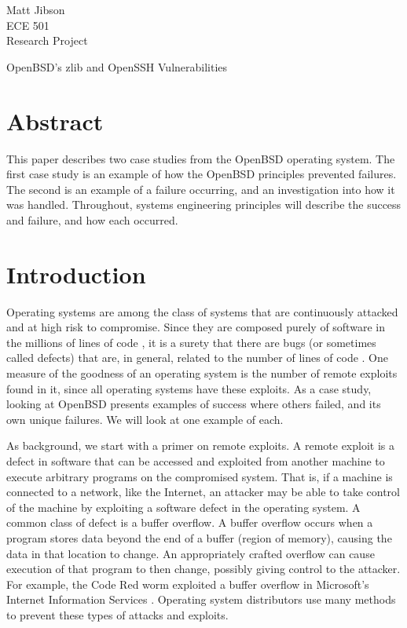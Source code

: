 \documentclass[12pt]{article}
\begin{document}
\begin{flushright}
Matt Jibson \\
ECE 501 \\
Research Project
\end{flushright}

\begin{center}
\Large OpenBSD's zlib and OpenSSH Vulnerabilities
\end{center}

{\setlength{\baselineskip}{1.6\baselineskip}

\section*{Abstract}

This paper describes two case studies from the OpenBSD operating system. The first case study is an example of how the OpenBSD principles prevented failures. The second is an example of a failure occurring, and an investigation into how it was handled. Throughout, systems engineering principles will describe the success and failure, and how each occurred.

\section*{Introduction}

Operating systems are among the class of systems that are continuously attacked and at high risk to compromise. Since they are composed purely of software in the millions of lines of code \cite{linux-lines} \cite{windows-lines}, it is a surety that there are bugs (or sometimes called defects) that are, in general, related to the number of lines of code \cite{code-complete}. One measure of the goodness of an operating system is the number of remote exploits found in it, since all operating systems have these exploits. As a case study, looking at OpenBSD presents examples of success where others failed, and its own unique failures. We will look at one example of each.

As background, we start with a primer on remote exploits. A remote exploit is a defect in software that can be accessed and exploited from another machine to execute arbitrary programs on the compromised system. That is, if a machine is connected to a network, like the Internet, an attacker may be able to take control of the machine by exploiting a software defect in the operating system. A common class of defect is a buffer overflow. A buffer overflow occurs when a program stores data beyond the end of a buffer (region of memory), causing the data in that location to change. An appropriately crafted overflow can cause execution of that program to then change, possibly giving control to the attacker. For example, the Code Red worm exploited a buffer overflow in Microsoft's Internet Information Services \cite{code-red}. Operating system distributors use many methods to prevent these types of attacks and exploits.

}
\end{document}

